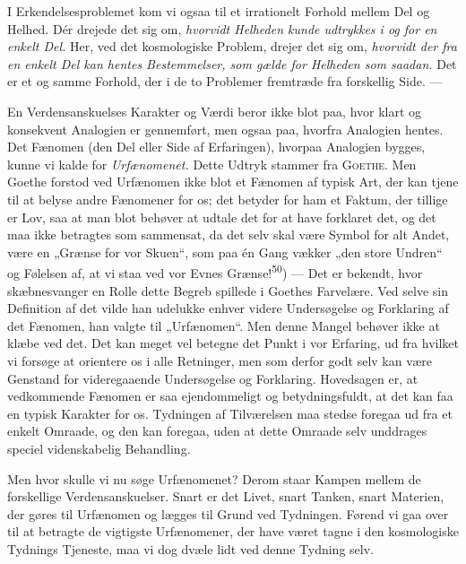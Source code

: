 \documentclass[12pt,a4paper,openany]{book}
\newcommand{\opage}[1]{\marginnote{\footnotesize\textit{[#1]}}}
\begin{document}
I Erkendelsesproblemet kom vi ogsaa til et irrationelt Forhold mellem Del og
Helhed. Dér drejede det sig om, \textit{hvorvidt Helheden kunde udtrykkes i og
for en enkelt Del.} Her, ved det kosmologiske Problem, drejer det sig om,
\textit{hvorvidt der fra en enkelt Del kan hentes Bestemmelser, som gælde for
Helheden som saadan.} Det er et og samme Forhold, der i de to Problemer
fremtræde fra forskellig Side. ---

En Verdensanskuelses Karakter og Værdi beror ikke blot paa, hvor klart og
konsekvent Analogien er gennemført, men ogsaa paa, hvorfra Analogien hentes.
Det Fænomen (den Del eller Side af Erfaringen), hvorpaa Analogien bygges, kunne
vi kalde for \textit{Urfænomenet.} Dette Udtryk stammer fra \textsc{Goethe}.
Men Goethe forstod ved Urfænomen ikke blot et Fænomen af typisk Art, der kan
tjene til at belyse andre Fænomener for os; det betyder for ham et Faktum, der
tillige er Lov, saa at man blot behøver at udtale det for at have forklaret
det, og det maa ikke betragtes som sammensat, da det selv skal være Symbol for
alt Andet, være en „Grænse for vor Skuen“, som paa én Gang vækker „den store
Undren“ og Følelsen af, at vi staa ved vor Evnes Grænse!\textsuperscript{50})
--- Det er bekendt, hvor skæbnesvanger en Rolle dette Begreb spillede i Goethes
Farvelære. Ved selve sin
\opage{57}Definition af det vilde han udelukke enhver videre Undersøgelse og
Forklaring af det Fænomen, han valgte til „Urfænomen“. Men denne Mangel behøver
ikke at klæbe ved det. Det kan meget vel betegne det Punkt i vor Erfaring, ud
fra hvilket vi forsøge at orientere os i alle Retninger, men som derfor godt
selv kan være Genstand for videregaaende Undersøgelse og Forklaring. Hovedsagen
er, at vedkommende Fænomen er saa ejendommeligt og betydningsfuldt, at det kan
faa en typisk Karakter for os. Tydningen af Tilværelsen maa stedse foregaa ud
fra et enkelt Omraade, og den kan foregaa, uden at dette Omraade selv unddrages
speciel videnskabelig Behandling.

Men hvor skulle vi nu søge Urfænomenet? Derom staar Kampen mellem de
forskellige Verdensanskuelser. Snart er det Livet, snart Tanken, snart
Materien, der gøres til Urfænomen og lægges til Grund ved Tydningen. Førend vi
gaa over til at betragte de vigtigste Urfænomener, der have været tagne i den
kosmologiske Tydnings Tjeneste, maa vi dog dvæle lidt ved denne Tydning selv.
\end{document}
